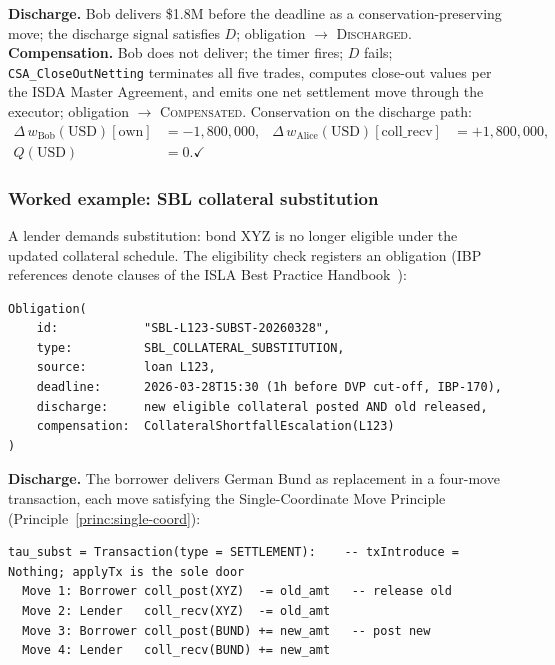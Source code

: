 \documentclass[11pt,a4paper]{article}
\begin{document}
\noindent \textbf{Discharge.} Bob delivers \$1.8M before the deadline as a conservation-preserving move; the discharge signal satisfies $D$; obligation $\to$ \textsc{Discharged}. \textbf{Compensation.} Bob does not deliver; the timer fires; $D$ fails; \texttt{CSA\_CloseOutNetting} terminates all five trades, computes close-out values per the ISDA Master Agreement, and emits one net settlement move through the executor; obligation $\to$ \textsc{Compensated}. Conservation on the discharge path:
\begin{align*}
\Delta\, w_{\mathrm{Bob}}(\text{USD})[\mathrm{own}] &= -1{,}800{,}000, &
\Delta\, w_{\mathrm{Alice}}(\text{USD})[\mathrm{coll\_recv}] &= +1{,}800{,}000, \\
Q(\text{USD}) &= 0. \checkmark
\end{align*}

\subsubsection{Worked example: SBL collateral substitution}
\label{sec:obligation-example-sbl}

A lender demands substitution: bond XYZ is no longer eligible under the updated collateral schedule. The eligibility check registers an obligation (IBP references denote clauses of the ISLA Best Practice Handbook~\cite{isla-ibp}):

\begin{lstlisting}
Obligation(
    id:            "SBL-L123-SUBST-20260328",
    type:          SBL_COLLATERAL_SUBSTITUTION,
    source:        loan L123,
    deadline:      2026-03-28T15:30 (1h before DVP cut-off, IBP-170),
    discharge:     new eligible collateral posted AND old released,
    compensation:  CollateralShortfallEscalation(L123)
)
\end{lstlisting}

\noindent \textbf{Discharge.} The borrower delivers German Bund as replacement in a four-move transaction, each move satisfying the Single-Coordinate Move Principle (Principle~\ref{princ:single-coord}):

\begin{lstlisting}
tau_subst = Transaction(type = SETTLEMENT):    -- txIntroduce = Nothing; applyTx is the sole door
  Move 1: Borrower coll_post(XYZ)  -= old_amt   -- release old
  Move 2: Lender   coll_recv(XYZ)  -= old_amt
  Move 3: Borrower coll_post(BUND) += new_amt   -- post new
  Move 4: Lender   coll_recv(BUND) += new_amt
\end{lstlisting}
\end{document}
